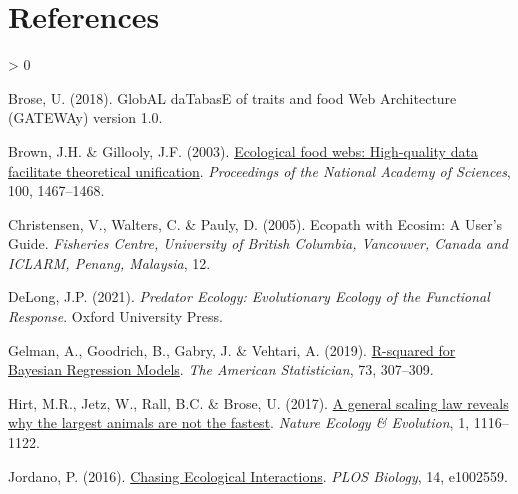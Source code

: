 \documentclass[11pt]{article}
\newlength{\cslhangindent}
\newenvironment{CSLReferences}[2] %
 {%
  \setlength{\parindent}{0pt}
  \ifodd #1 \everypar{\setlength{\hangindent}{\cslhangindent}}\ignorespaces\fi
  \ifnum #2 > 0
  \setlength{\parskip}{#2\baselineskip}
  \fi
 }%
 {}
\begin{document}
\hypertarget{references}{%
\section*{References}\label{references}}

\hypertarget{refs}{}
\begin{CSLReferences}{1}{0}
\leavevmode{}%
Brose, U. (2018). GlobAL daTabasE of traits and food Web Architecture
(GATEWAy) version 1.0.

\leavevmode{}%
Brown, J.H. \& Gillooly, J.F. (2003).
\href{https://doi.org/10.1073/pnas.0630310100}{Ecological food webs:
High-quality data facilitate theoretical unification}. \emph{Proceedings
of the National Academy of Sciences}, 100, 1467--1468.

\leavevmode{}%
Christensen, V., Walters, C. \& Pauly, D. (2005). Ecopath with Ecosim: A
User's Guide. \emph{Fisheries Centre, University of British Columbia,
Vancouver, Canada and ICLARM, Penang, Malaysia}, 12.

\leavevmode{}%
DeLong, J.P. (2021). \emph{Predator Ecology: Evolutionary Ecology of the
Functional Response}. Oxford University Press.

\leavevmode{}%
Gelman, A., Goodrich, B., Gabry, J. \& Vehtari, A. (2019).
\href{https://doi.org/10.1080/00031305.2018.1549100}{R-squared for
Bayesian Regression Models}. \emph{The American Statistician}, 73,
307--309.

\leavevmode{}%
Hirt, M.R., Jetz, W., Rall, B.C. \& Brose, U. (2017).
\href{https://doi.org/10.1038/s41559-017-0241-4}{A general scaling law
reveals why the largest animals are not the fastest}. \emph{Nature
Ecology \& Evolution}, 1, 1116--1122.

\leavevmode{}%
Jordano, P. (2016).
\href{https://doi.org/10.1371/journal.pbio.1002559}{Chasing Ecological
Interactions}. \emph{PLOS Biology}, 14, e1002559.

\end{CSLReferences}
\end{document}
